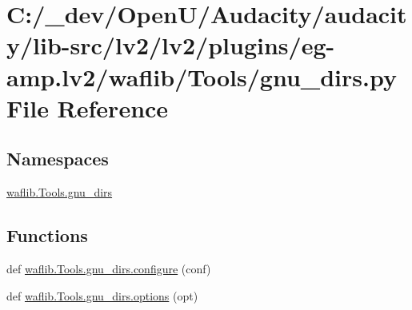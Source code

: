 \hypertarget{lv2_2plugins_2eg-amp_8lv2_2waflib_2_tools_2gnu__dirs_8py}{}\section{C\+:/\+\_\+dev/\+Open\+U/\+Audacity/audacity/lib-\/src/lv2/lv2/plugins/eg-\/amp.lv2/waflib/\+Tools/gnu\+\_\+dirs.py File Reference}
\label{lv2_2plugins_2eg-amp_8lv2_2waflib_2_tools_2gnu__dirs_8py}
\subsection*{Namespaces}
\begin{DoxyCompactItemize}
\item 
 \hyperlink{namespacewaflib_1_1_tools_1_1gnu__dirs}{waflib.\+Tools.\+gnu\+\_\+dirs}
\end{DoxyCompactItemize}
\subsection*{Functions}
\begin{DoxyCompactItemize}
\item 
def \hyperlink{namespacewaflib_1_1_tools_1_1gnu__dirs_a03d9dce5a06f4f739652667447f57eb9}{waflib.\+Tools.\+gnu\+\_\+dirs.\+configure} (conf)
\item 
def \hyperlink{namespacewaflib_1_1_tools_1_1gnu__dirs_ad291b2ee61d479ae1005acd11eaf6ead}{waflib.\+Tools.\+gnu\+\_\+dirs.\+options} (opt)
\end{DoxyCompactItemize}
